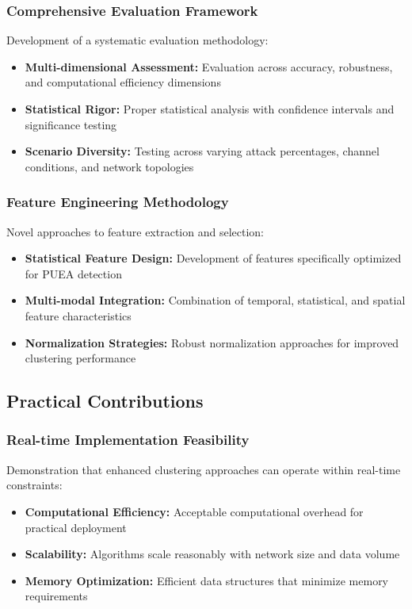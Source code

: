 \subsubsection{Comprehensive Evaluation Framework}
Development of a systematic evaluation methodology:
\begin{itemize}
\item \textbf{Multi-dimensional Assessment:} Evaluation across accuracy, robustness, and computational efficiency dimensions
\item \textbf{Statistical Rigor:} Proper statistical analysis with confidence intervals and significance testing
\item \textbf{Scenario Diversity:} Testing across varying attack percentages, channel conditions, and network topologies
\end{itemize}

\subsubsection{Feature Engineering Methodology}
Novel approaches to feature extraction and selection:
\begin{itemize}
\item \textbf{Statistical Feature Design:} Development of features specifically optimized for PUEA detection
\item \textbf{Multi-modal Integration:} Combination of temporal, statistical, and spatial feature characteristics
\item \textbf{Normalization Strategies:} Robust normalization approaches for improved clustering performance
\end{itemize}

\subsection{Practical Contributions}

\subsubsection{Real-time Implementation Feasibility}
Demonstration that enhanced clustering approaches can operate within real-time constraints:
\begin{itemize}
\item \textbf{Computational Efficiency:} Acceptable computational overhead for practical deployment
\item \textbf{Scalability:} Algorithms scale reasonably with network size and data volume
\item \textbf{Memory Optimization:} Efficient data structures that minimize memory requirements
\end{itemize}

